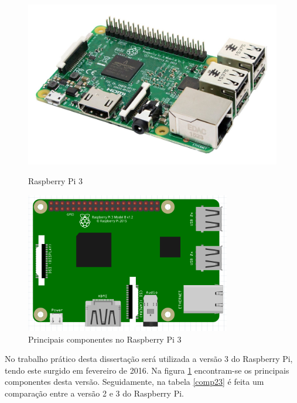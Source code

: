 \begin{figure}[h]
	\centering
	\begin{minipage}[b]{0.49\textwidth}
		\centering
		\includegraphics[width=\textwidth]{img/hardware/rasp3-img.jpg}
		\caption{Raspberry Pi 3}
		\label{rasp1}
	\end{minipage}
	\hfill
	\begin{minipage}[b]{0.49\textwidth}
		\centering
		\includegraphics[width=0.8\textwidth]{img/hardware/rasp-esquema.PNG}
		\caption{Principais componentes no Raspberry Pi 3 }
		\label{comprasp1}
		
	\end{minipage}
\end{figure}


No trabalho prático desta dissertação será utilizada a versão 3 do Raspberry Pi, tendo este surgido em fevereiro de 2016. Na figura \ref{comprasp1} encontram-se os principais componentes desta versão. Seguidamente, na tabela \ref{comp23} é feita um comparação entre a versão 2 e 3 do Raspberry Pi. 




